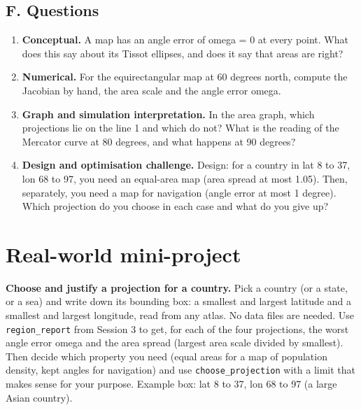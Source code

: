 \documentclass[11pt,a4paper]{article}
\begin{document}
\subsection*{F. Questions}
\begin{enumerate}[nosep]
\item \textbf{Conceptual.} A map has an angle error of omega = 0 at every point. What does this say about its Tissot ellipses, and does it say that areas are right?
\item \textbf{Numerical.} For the equirectangular map at 60 degrees north, compute the Jacobian by hand, the area scale and the angle error omega.
\item \textbf{Graph and simulation interpretation.} In the area graph, which projections lie on the line 1 and which do not? What is the reading of the Mercator curve at 80 degrees, and what happens at 90 degrees?
\item \textbf{Design and optimisation challenge.} Design: for a country in lat 8 to 37, lon 68 to 97, you need an equal-area map (area spread at most 1.05). Then, separately, you need a map for navigation (angle error at most 1 degree). Which projection do you choose in each case and what do you give up?
\end{enumerate}

\section{Real-world mini-project}
\textbf{Choose and justify a projection for a country.} Pick a country (or a state, or a sea) and write down its bounding box: a smallest and largest latitude and a smallest and largest longitude, read from any atlas. No data files are needed. Use \texttt{region\_report} from Session 3 to get, for each of the four projections, the worst angle error omega and the area spread (largest area scale divided by smallest). Then decide which property you need (equal areas for a map of population density, kept angles for navigation) and use \texttt{choose\_projection} with a limit that makes sense for your purpose. Example box: lat 8 to 37, lon 68 to 97 (a large Asian country).
\end{document}
